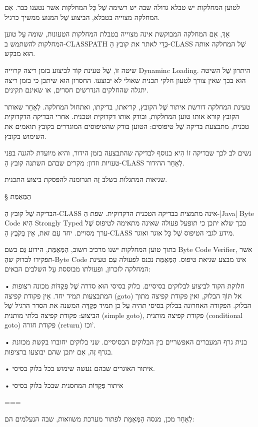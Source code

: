 לטוען המחלקות יש טבלא גדולה שבה יש רשימה שֶׁל כָּל המחלקות
אשר נטענו כבר. אִם המחלקה מצוייה בטבלא, הביצוע שֶׁל המנוע ממשיך כרגיל.

אַךְ, אִם המחלקה המבוקשת אינה מצוייה בטבלת המחלקות הטעונות, שומה עַל
טוען המחלקות להשתמש ב-CLASSPATH כְּדֵי לאתר את קובץ הַ-CLASS שֶׁל
המחלקה אותה הוּא מבקש.

שיטה זוֹ, שֶׁל טעינת קוֹד לביצוע בזמן ריצה קרוייה Dynaminc Loading. היתרון שֶׁל השיטה
הוּא בכך שאין צורך לטעון חלקי תכנית שאולי לֹא יבוצעו. החסרון הוּא שיתכן כי בזמן
ריצה יתגלה שהחלקים הנדרשים חסרים, או שאינם תקינים.

טעינת המחלקה דורשת איתור שֶׁל הקובץ, קריאתו, בדיקתו, ואתחול המחלקה. לְאַחַר שאותר
הקובץ קורא אותו טוען המחלקות, ובודק אותו דקדוקית וטכנית. אחרי הבדיקה הדקדוקית
טכנית, מתבצעת בדיקה שֶׁל טיפוסים: הטוען בודק שהטיפוסים המוגדרים בקובץ תואמים את
השימוש בקובץ.

נשים לב לכך שבדיקה זוֹ הִיא בנוסף לבדיקה שהתבצעה בזמן הידור, והיא מיועדת להגנה
בפני טעויות וזדון: מקרים שבהם השתנה קובץ הַ-CLASS לְאַחַר ההידור.

שגיאות המתגלות בשלב זֶה תגרומנה להפסקת ביצוע התכנית.

§ הַמְּאַמֵּת

הבדיקה שֶׁל קובץ הַ-CLASS אינה מתמצית בבדיקה הטכנית הדקדוקית. שפת הַ-|Java| Byte
Code הִיא Strongly Typed בכך שלא יתכן כי תופעל פעולה שאינה מתאימה לטיפוס שֶׁל
ערך מסויים. יחד עִם זאת, אֵין בְּקֹבֶץ הַ-CLASS מידע לגבי הטיפוס שֶׁל כָּל אוגר
ואוגר.

בתוך טוען המחלקות ישנו מרכיב חשוב, הַמְּאַמֵּת, הידוע גַּם בשם Byte Code
Verifier, אשר תפקידו לבדוק שהַ-Byte Code אינו מבצע שגיאת טיפוס. הַמְּאַמֵּת
נכנס לפעולה עִם טעינת המחלקה לזכרון, ופעולתו מבוססת עַל השלבים הבאים:

• חלוקת הקוד לביצוע לבלוקים בסיסיים. בלוק בסיסי הוּא סדרה שֶׁל פְּקֻדּוֹת
מכונה רצופות המתבצעות תמיד יחד. אֵין פקודת קפיצה (goto) אל תּוֹךְ הבלוק,
ואין פקודת קפיצה מתוך הבלוק. הפקודה האחרונה בבלוק בסיסי תהיה עַל כן
תמיד פְּקֻדָּה המשנה את הסדר הרגיל שֶׁל הביצוע: פקודת קפיצה בלתי מותנית
(simple goto), פקודת קפיצה מותנית (conditional goto) פקודת חזרה
(return) וכו'.

• בנית גרף המעברים האפשריים בין הבלוקים הבסיסיים. שני בלוקים יחוברו בקשת מכוונת
בגרף זֶה, אִם יתכן שהם יבוצעו ברציפות.

• איתור האוגרים שבהם נעשה שימוש בכל בלוק בסיסי.

• איתור פְּקֻדּוֹת המחסנית שבכל בלוק בסיסי

===

לְאַחַר מכן, מנסה הַמְּאַמֵּת לפתור מערכת משוואות, שבה הנעלמים הם:

